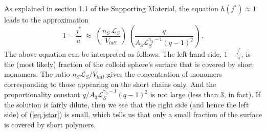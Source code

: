 \documentclass[journal=mamobx,manuscript=article]{achemso}
\newcommand{\leng}{\mathcal{L}}
\begin{document}


As explained in section 1.1 of the Supporting Material, the equation
$h(j^*)\approx 1$ leads to the approximation
\begin{equation}
    \label{eq.jstar}
     1-\frac{j^*}{a}     \; \approx   \; 
        \left(  \frac{n_S\,\leng_S}{V_{latt} }\right) \,\left(   \frac{q}{A_3\leng_S^{\gamma_3-1}(q-1)^2}\right)  \,.
\end{equation}
The above equation can be interpreted as follows.  The left hand side, $1-\frac{j^*}{a}$, is the (most likely) fraction of the colloid sphere's surface that is covered by short monomers.  The ratio $n_S\leng_S/V_{latt}$ gives
the concentration of monomers corresponding to those appearing on the short chains only.
And the proportionality constant $q/A_3\leng_S^{\gamma_3-1}(q-1)^2$ is not large (less than 3, in fact).
If the solution is fairly dilute, then we see that the right side (and hence the left side) of (\ref{eq.jstar}) is small,
which tells us that only a small fraction of the surface is covered by short polymers.


\end{document}
